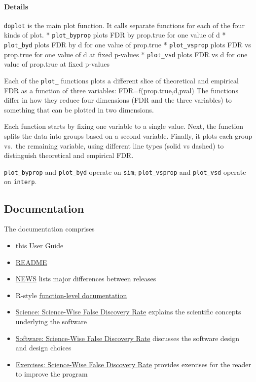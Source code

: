 \documentclass[]{article}
\providecommand{\tightlist}{%
  \setlength{\itemsep}{0pt}\setlength{\parskip}{0pt}}
\let\oldparagraph\paragraph
\renewcommand{\paragraph}[1]{\oldparagraph{#1}\mbox{}}
\begin{document}
\endgroup

\paragraph{Details}\label{details-1}

\texttt{doplot} is the main plot function. It calls separate functions
for each of the four kinds of plot. * \texttt{plot\_byprop} plots FDR by
prop.true for one value of d * \texttt{plot\_byd} plots FDR by d for one
value of prop.true * \texttt{plot\_vsprop} plots FDR vs prop.true for
one value of d at fixed p-values * \texttt{plot\_vsd} plots FDR vs d for
one value of prop.true at fixed p-values

Each of the \texttt{plot\_} functions plots a different slice of
theoretical and empirical FDR as a function of three variables:
FDR=f(prop.true,d,pval) The functions differ in how they reduce four
dimensions (FDR and the three variables) to something that can be
plotted in two dimensions.

Each function starts by fixing one variable to a single value. Next, the
function splits the data into groups based on a second variable.
Finally, it plots each group vs.~the remaining variable, using different
line types (solid vs dashed) to distinguish theoretical and empirical
FDR.

\texttt{plot\_byprop} and \texttt{plot\_byd} operate on \texttt{sim};
\texttt{plot\_vsprop} and \texttt{plot\_vsd} operate on \texttt{interp}.

\subsection{Documentation}\label{documentation}

The documentation comprises

\begin{itemize}
\tightlist
\item
  this User Guide
\item
  \href{README.pdf}{README}
\item
  \href{NEWS.pdf}{NEWS} lists major differences between releases
\item
  R-style \href{TBD}{function-level documentation}
\item
  \href{science.pdf}{Science: Science-Wise False Discovery Rate}
  explains the scientific concepts underlying the software
\item
  \href{software.pdf}{Software: Science-Wise False Discovery Rate}
  discusses the software design and design choices
\item
  \href{exercises.pdf}{Exercises: Science-Wise False Discovery Rate}
  provides exercises for the reader to improve the program
\end{itemize}
\end{document}
